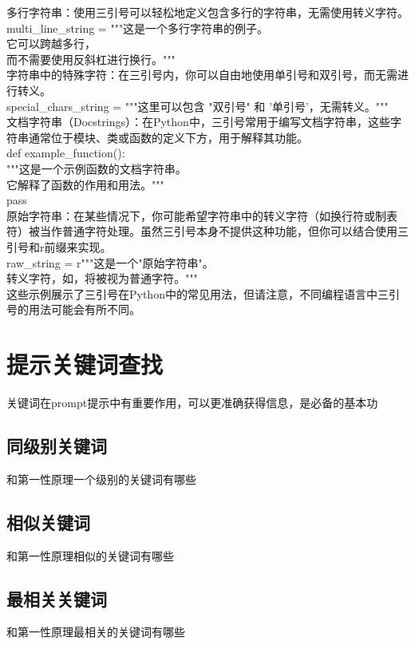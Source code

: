 \documentclass[12pt]{book}
\begin{document}
多行字符串：使用三引号可以轻松地定义包含多行的字符串，无需使用转义字符。\\
multi\_line\_string = """这是一个多行字符串的例子。\\
它可以跨越多行，\\
而不需要使用反斜杠进行换行。"""\\
字符串中的特殊字符：在三引号内，你可以自由地使用单引号和双引号，而无需进行转义。\\
special\_chars\_string = """这里可以包含 "双引号" 和 '单引号'，无需转义。"""\\
文档字符串（Docstrings）：在Python中，三引号常用于编写文档字符串，这些字符串通常位于模块、类或函数的定义下方，用于解释其功能。\\
def example\_function():\\
"""这是一个示例函数的文档字符串。\\
它解释了函数的作用和用法。"""\\
pass\\
原始字符串：在某些情况下，你可能希望字符串中的转义字符（如换行符或制表符）被当作普通字符处理。虽然三引号本身不提供这种功能，但你可以结合使用三引号和r前缀来实现。\\
raw\_string = r"""这是一个"原始字符串"。\\
转义字符，如，将被视为普通字符。"""\\
这些示例展示了三引号在Python中的常见用法，但请注意，不同编程语言中三引号的用法可能会有所不同。\\

\chapter{提示关键词查找}
关键词在prompt提示中有重要作用，可以更准确获得信息，是必备的基本功

\section{同级别关键词}
和{第一性原理}一个级别的关键词有哪些

\section{相似关键词}
和{第一性原理}相似的关键词有哪些

\section{最相关关键词}
和{第一性原理}最相关的关键词有哪些
\end{document}
